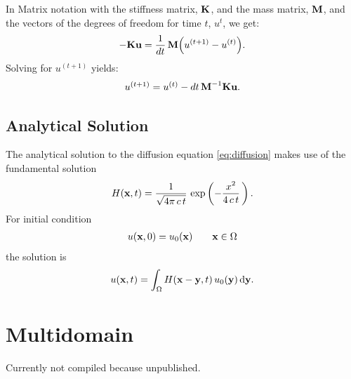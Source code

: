In Matrix notation with the stiffness matrix, $\textbf{K}$, and the mass matrix, $\textbf{M}$, and the vectors of the degrees of freedom for time $t$, $u^{t}$, we get:
\begin{equation*}
  \begin{array}{lll}
    -\textbf{K}\textbf{u} = \displaystyle\frac{\displaystyle{1}}{\displaystyle{dt}}\, \textbf{M}\Big(u^{(t+1)} - u^{(t)}\Big).
  \end{array}
\end{equation*}
Solving for $u^{(t+1)}$ yields:
\begin{equation*}
  \begin{array}{lll}
    u^{(t+1)} = u^{(t)} - dt \,\textbf{M}^{-1}\textbf{K}\textbf{u}.
  \end{array}
\end{equation*}
\subsection{Analytical Solution}
The analytical solution to the diffusion equation \eqref{eq:diffusion} makes use of the fundamental solution
\begin{equation*}
  \begin{array}{lll}
    H(\textbf{x},t) = \displaystyle\frac{\displaystyle{1}}{\displaystyle{\sqrt{4\pi\,c\,t}}}\,\exp\left(-\displaystyle\frac{\displaystyle{x^2}}{\displaystyle{4\,c\,t}}\,\right).
  \end{array}
\end{equation*}
For initial condition
\begin{equation*}
  \begin{array}{lll}
    u(\textbf{x},0) = u_0(\textbf{x})\qquad \textbf{x} \in \Omega
  \end{array}
\end{equation*}
the solution is
\begin{equation*}
  \begin{array}{lll}
    u(\bfx,t) = \ds\int_\Omega H(\bfx - \bfy,t)\,u_0(\bfy)\,\d \bfy.
  \end{array}
\end{equation*}

\section{Multidomain}

Currently not compiled because unpublished.

